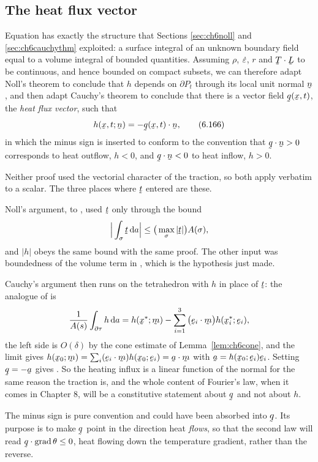 
\subsection*{The heat flux vector}

Equation  has exactly the structure that Sections
\ref{sec:ch6noll} and \ref{sec:ch6cauchythm} exploited: a surface
integral of an unknown boundary field equal to a volume integral of
bounded quantities. Assuming $\rho$, $\dot{\varepsilon}$, $r$ and $\bT\cdot\bL$
to be continuous, and hence bounded on compact subsets, we can
therefore adapt Noll's theorem to conclude that $h$ depends on
$\partial P_{t}$ through its local unit normal $\bn$, and then adapt
Cauchy's theorem to conclude that there is a vector field
$\bq(\bx,t)$, the \emph{heat flux vector}, such that
\begin{equation}
   h(\bx,t;\bn)=-\ip{\bq(\bx,t)}\bn ,
   \tag{6.166}\label{eq:6.166}
\end{equation}
in which the minus sign is inserted to conform to the convention that
$\ip\bq\bn>0$ corresponds to heat outflow, $h<0$, and $\ip\bq\bn<0$ to
heat inflow, $h>0$.

\begin{remark}\label{rem:ch6heatcauchy}
Neither proof used the vectorial character of the traction, so both
apply verbatim to a scalar. The three places where $\bt$ entered are
these.

Noll's argument,  to , used $\bt$ only through the
bound
\[
   \Big|\int_{\sigma}\bt\,\dl a\Big|
   \leq\big(\max_{\sigma}|\bt|\big)A(\sigma),
\]
and $|h|$ obeys the same bound with the same proof. The other input was
boundedness of the volume term in , which is the hypothesis
just made.

Cauchy's argument then runs on the tetrahedron with $h$ in place of
$\bt$: the analogue of  is
\[
   \frac{1}{A(s)}\int_{\partial\tau}h\,\dl a
   =h(\bx^{*};\bm)-\sum_{i=1}^{3}\big(\ip{\be_{i}}\bm\big)
     h(\bx^{*}_{i};\be_{i}),
\]
the left side is $O(\delta)$ by the cone estimate of
Lemma~\ref{lem:ch6cone}, and the limit gives
$h(\bx_{0};\bm)=\sum_{i}(\ip{\be_{i}}\bm)h(\bx_{0};\be_{i})
=\ip{\ba}{\bm}$ with $\ba=h(\bx_{0};\be_{i})\be_{i}$. Setting
$\bq=-\ba$ gives . So the heating influx is a linear
function of the normal for the same reason the traction is, and the
whole content of Fourier's law, when it comes in Chapter 8, will be a
constitutive statement about $\bq$ and not about $h$.

The minus sign is pure convention and could have been absorbed into
$\bq$. Its purpose is to make $\bq$ point in the direction heat
\emph{flows}, so that the second law will read $\ip\bq{\grad\theta}\leq0$,
heat flowing down the temperature gradient, rather than the reverse.
\end{remark}

